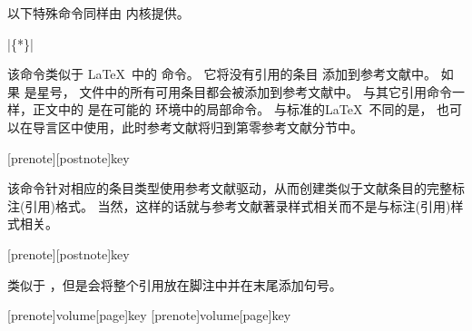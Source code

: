 
以下特殊命令同样由 \biblatex 内核提供。

\begin{ltxsyntax}

|\{*\}|


该命令类似于 \LaTeX\ 中的  命令。
它将没有引用的条目  添加到参考文献中。
如果  是星号， 文件中的所有可用条目都会被添加到参考文献中。
与其它引用命令一样，正文中的  是在可能的  环境中的局部命令。
与标准的\LaTeX\ 不同的是， 也可以在导言区中使用，此时参考文献将归到第零参考文献分节中。

[prenote][postnote]{key}


该命令针对相应的条目类型使用参考文献驱动，从而创建类似于文献条目的完整标注(引用)格式。
当然，这样的话就与参考文献著录样式相关而不是与标注(引用)样式相关。

[prenote][postnote]{key}


类似于 ，但是会将整个引用放在脚注中并在末尾添加句号。

[prenote]{volume}[page]{key}
[prenote]{volume}[page]{key}



\end{ltxsyntax}
